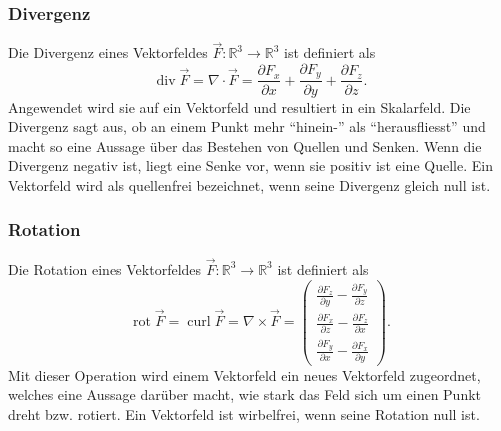 \subsubsection{Divergenz}
Die Divergenz eines Vektorfeldes $\vec{F}:\mathbb{R}^3 \rightarrow \mathbb{R}^3$ ist definiert als 
\[ \operatorname{div}\vec{F} = \nabla\cdot\vec{F} 
= \frac{\partial F_x}{\partial x} + \frac{\partial F_y}{\partial y} + \frac{\partial F_z}{\partial z}. \]
Angewendet wird sie auf ein Vektorfeld und resultiert in ein Skalarfeld.
Die Divergenz sagt aus, ob an einem Punkt mehr ``hinein-'' als ``herausfliesst'' und macht so eine Aussage über das Bestehen von Quellen und Senken. 
Wenn die Divergenz negativ ist, liegt eine Senke vor, wenn sie positiv ist eine Quelle.
Ein Vektorfeld wird als quellenfrei bezeichnet, wenn seine Divergenz gleich null ist.

\subsubsection{Rotation}
Die Rotation eines Vektorfeldes $\vec{F}:\mathbb{R}^3 \rightarrow \mathbb{R}^3$ ist definiert als
\[
\renewcommand{\arraystretch}{1.9} 
\operatorname{rot}\vec{F} = 
\operatorname{curl}\vec{F}
=\nabla\times\vec{F}
= \begin{pmatrix}
	\displaystyle
	\frac{\partial F_z}{\partial y} -\frac{\partial F_y}{\partial z}\\
	\displaystyle
	\frac{\partial F_x}{\partial z} -\frac{\partial F_z}{\partial x}\\
	\displaystyle
	\frac{\partial F_y}{\partial x} -\frac{\partial F_x}{\partial y}
\end{pmatrix}
. \]
Mit dieser Operation wird einem Vektorfeld ein neues Vektorfeld zugeordnet, welches eine Aussage darüber macht, wie stark das Feld sich um einen Punkt dreht bzw. rotiert.
Ein Vektorfeld ist wirbelfrei, wenn seine Rotation null ist.

